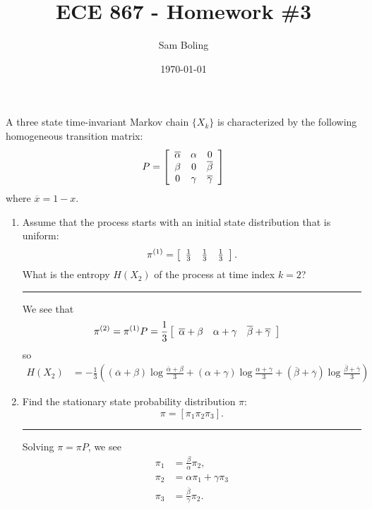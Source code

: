 \documentclass{article}
\title{ECE 867 - Homework \#3}
\author{Sam Boling}
\date{\today}
\newcommand{\horline}
           {\begin{center}
              \noindent\rule{8cm}{0.4pt}
            \end{center}}
\begin{document}
\maketitle

A three state time-invariant Markov chain $\{X_{k}\}$ is characterized by
the following homogeneous transition matrix:
$$
P = \left[\begin{array}{c c c}
  \overline{\alpha} & \alpha & 0 \\
  \beta             & 0      & \overline{\beta} \\
  0                 & \gamma & \overline{\gamma}
\end{array}\right]
$$
where $\overline{x} = 1 - x$.
\begin{enumerate}[label=(\alph*)]
  \item{Assume that the process starts with an initial state distribution
        that is uniform:
        $$
        \pi^{(1)} = \left[\begin{array}{c c c}
            \frac{1}{3} & \frac{1}{3} & \frac{1}{3}
                    \end{array}\right].
        $$
        What is the entropy $H(X_2)$ of the process at time index $k=2$?
        \horline
        We see that
        \begin{align*}
        \pi^{(2)} & = \pi^{(1)}P = \frac{1}{3}\left[\begin{array}{c c c}
          \overline{\alpha} + \beta & 
          \alpha + \gamma           &
          \overline{\beta} + \overline{\gamma}\end{array}\right]
        \end{align*}
        so
        \begin{align*}
        H(X_2) &= -\frac{1}{3}\left(
        (\overline{\alpha} + \beta)\log \frac{\overline{\alpha} + \beta}{3}
      + (\alpha + \gamma)\log \frac{\alpha + \gamma}{3}
      + (\overline{\beta} + \overline{\gamma})
          \log\frac{\overline{\beta} + \overline{\gamma}}{3}\right)
        \end{align*}
       }
  \item{Find the stationary state probability distribution $\pi$:
        $$
        \pi = \left[\pi_1 \pi_2 \pi_3\right].
        $$
        \horline
        Solving $\pi = \pi P$, we see
        \begin{align*}
        \pi_1 &= \frac{\beta}{\alpha} \pi_2, \\
        \pi_2 &= \alpha \pi_1 + \gamma \pi_3 \\
        \pi_3 &= \frac{\overline{\beta}}{\gamma} \pi_2.

\end{align*}}
\end{enumerate}
\end{document}
